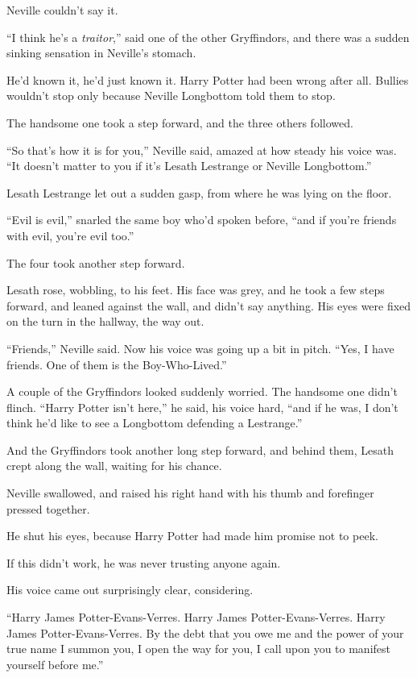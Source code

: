 Neville couldn’t say it.

“I think he’s a \emph{traitor},” said one of the other Gryffindors, and there was a sudden sinking sensation in Neville’s stomach.

He’d known it, he’d just known it. Harry Potter had been wrong after all. Bullies wouldn’t stop only because Neville Longbottom told them to stop.

The handsome one took a step forward, and the three others followed.

“So that’s how it is for you,” Neville said, amazed at how steady his voice was. “It doesn’t matter to you if it’s Lesath Lestrange or Neville Longbottom.”

Lesath Lestrange let out a sudden gasp, from where he was lying on the floor.

“Evil is evil,” snarled the same boy who’d spoken before, “and if you’re friends with evil, you’re evil too.”

The four took another step forward.

Lesath rose, wobbling, to his feet. His face was grey, and he took a few steps forward, and leaned against the wall, and didn’t say anything. His eyes were fixed on the turn in the hallway, the way out.

“Friends,” Neville said. Now his voice was going up a bit in pitch. “Yes, I have friends. One of them is the Boy-Who-Lived.”

A couple of the Gryffindors looked suddenly worried. The handsome one didn’t flinch. “Harry Potter isn’t here,” he said, his voice hard, “and if he was, I don’t think he’d like to see a Longbottom defending a Lestrange.”

And the Gryffindors took another long step forward, and behind them, Lesath crept along the wall, waiting for his chance.

Neville swallowed, and raised his right hand with his thumb and forefinger pressed together.

He shut his eyes, because Harry Potter had made him promise not to peek.

If this didn’t work, he was never trusting anyone again.

His voice came out surprisingly clear, considering.

“Harry James Potter-Evans-Verres. Harry James Potter-Evans-Verres. Harry James Potter-Evans-Verres. By the debt that you owe me and the power of your true name I summon you, I open the way for you, I call upon you to manifest yourself before me.”

